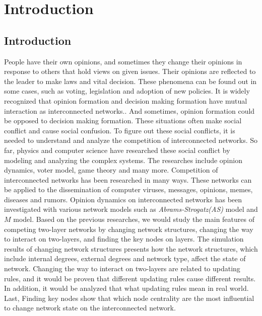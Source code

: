 
\chapter{Introduction}
\label{chap:intro}
\section{Introduction}
People have their own opinions, and sometimes they change their opinions in response to others that hold views on given issues. Their opinions are reflected to the leader to make laws and vital decision. These phenomena can be found out  in some cases, such as voting, legislation and adoption of new policies. It is widely recognized that opinion formation and decision making formation have mutual interaction as interconnected networks.\parencite{mikko2014, danziger2019, newman2010, boccaletti2014, domenico2013, tomasini2015, namkhanhvu2017}. And sometimes, opinion formation could be opposed to decision making formation. These situations often make social conflict and cause social confusion. To figure out these social conflicts, it is needed to understand and analyze the competition of interconnected networks. So far, physics and computer science have researched these social conflict by modeling and analyzing the complex systems\parencite{fangwu2004, zuev2012, laguna2004, masuda2014}. The researches include opinion dynamics, voter model, game theory and many more.\parencite{smyrnakis2019, bianconi2018, redner2017, haibo2017, amato2017, quattrociocchi2014, casey2009} 
Competition of interconnected networks has been researched in many ways. These networks can be applied to the dissemination of computer viruses, messages, opinions, memes, diseases and rumors\parencite{hua2014,shenyu2018, zhou2018, alvarez2016,gomez2015,diep2017,rocca2014,velasquez2018}. Opinion dynamics on interconnected networks has been investigated with various network models such as \textit{Abrams-Strogatz(AS)} model\parencite{abrams2003,vazquez2010} and $M$ model\parencite{rocca2014}.  Based on the previous researches, we would study the main features of competing two-layer networks by changing network structures, changing the way to interact on two-layers, and finding the key nodes on layers. The simulation results of changing network structures presents how the network structures, which include internal degrees, external degrees and network type, affect the state of network. Changing the way to interact on two-layers are related to updating rules, and it would be proven that different updating rules cause different results. In addition, it would be analyzed that what updating rules mean in real world. Last, Finding key nodes show that which node centrality are the most influential to change network state on the interconnected network. 
